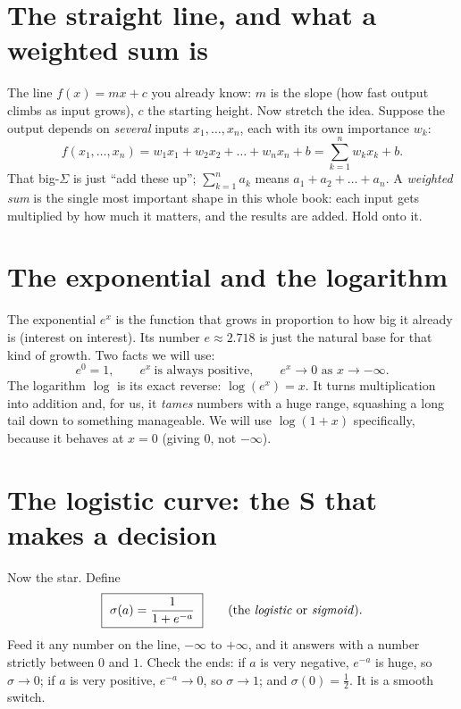\documentclass[11pt,oneside]{book}
\begin{document}
\section{The straight line, and what a weighted sum is}
The line $f(x)=mx+c$ you already know: $m$ is the slope (how fast output climbs as
input grows), $c$ the starting height. Now stretch the idea. Suppose the output
depends on \emph{several} inputs $x_1,\dots,x_n$, each with its own importance $w_k$:
\begin{equation}
f(x_1,\dots,x_n)=w_1x_1+w_2x_2+\dots+w_nx_n + b
=\sum_{k=1}^{n}w_k x_k + b .
\end{equation}
That big-$\Sigma$ is just ``add these up''; $\sum_{k=1}^{n}a_k$ means
$a_1+a_2+\dots+a_n$. A \emph{weighted sum} is the single most important shape in this
whole book: each input gets multiplied by how much it matters, and the results are
added. Hold onto it.

\section{The exponential and the logarithm}
The exponential $e^{x}$ is the function that grows in proportion to how big it already
is (interest on interest). Its number $e\approx2.718$ is just the natural base for
that kind of growth. Two facts we will use:
\begin{equation}
e^{0}=1,\qquad e^{x}\ \text{is always positive},\qquad e^{x}\to 0 \text{ as } x\to-\infty .
\end{equation}
The logarithm $\log$ is its exact reverse: $\log(e^{x})=x$. It turns multiplication
into addition and, for us, it \emph{tames} numbers with a huge range, squashing a long
tail down to something manageable. We will use $\log(1+x)$ specifically, because it
behaves at $x=0$ (giving $0$, not $-\infty$).

\section{The logistic curve: the S that makes a decision}
Now the star. Define
\begin{equation}
\boxed{\ \sigma(a)=\frac{1}{1+e^{-a}}\ }\qquad\text{(the \emph{logistic} or \emph{sigmoid}).}
\label{eq:sigmoid}
\end{equation}
Feed it any number on the line, $-\infty$ to $+\infty$, and it answers with a number
strictly between $0$ and $1$. Check the ends: if $a$ is very negative, $e^{-a}$ is
huge, so $\sigma\to0$; if $a$ is very positive, $e^{-a}\to0$, so $\sigma\to1$; and
$\sigma(0)=\tfrac12$. It is a smooth switch.
\end{document}
